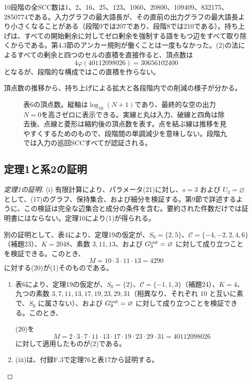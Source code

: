 \documentclass[11pt,reqno]{amsart}
\theoremstyle{definition}
\theoremstyle{definition}
\theoremstyle{remark}
\providecommand{\tightlist}{\setlength{\itemsep}{0pt}\setlength{\parskip}{0pt}}
\begin{document}
10段階の全SCC数は1、2、16、25、123、1060、20800、109409、832175、2850774である。入力グラフの最大語長が、その直前の出力グラフの最大語長より小さくなることがある（段階9では207であり、段階8では210である）。持ち上げは、すべての開始剰余に対してゼロ剰余を強制する語をもつ辺をすべて取り除くからである。第4.3節のアンカー規則が働くことは一度もなかった。(2)の法によるすべての剰余と四つのセルの直積を直接作ると、頂点数は
\[
4\varphi(40112098026)=30656102400
\]
となるが、段階的な構成ではこの直積を作らない。

頂点数の推移から、持ち上げによる拡大と各段階内での削減の様子が分かる。

\begin{figure}[htbp]
\centering

\caption{表6の頂点数。縦軸は\(\log_{10}(N+1)\)であり、最終的な空の出力\(N=0\)を高さゼロに表示できる。実線と丸は入力、破線と四角は除去後、点線と菱形は縮約後の頂点数を表す。点を結ぶ線は推移を見やすくするためのもので、段階間の単調減少を意味しない。段階九では入力の巡回SCCすべてが認証される。}
\label{fig:stage-counts}
\end{figure}

\subsection{定理1と系2の証明}\label{sec:5.4}

\begin{proof}[定理1の証明]\leavevmode\label{proof:1}
(i) 有限計算により、パラメータ(21)に対し、\(s=3\) および \(U_3=\varnothing\) として、(17)のグラフ、保持集合、および細分を検証する。第9節で詳述するように、この検証は完全な辺集合と成分の条件を含む。要約された件数だけでは証明書にはならない。定理10により(1)が得られる。

別の証明として、表4により、定理19の仮定が、\(S_0=\{2,5\}\)、\(\mathcal C=\{-4,-2,2,4,6\}\)（補題23）、\(K=2048\)、素数 \(3,11,13\)、および \(G_3^{\rm out}=\varnothing\) に対して成り立つことを検証できる。このとき、
\[
M=10\cdot3\cdot11\cdot13=4290
\]
に対する(20)が(1)そのものである。

\begin{enumerate}
\def\labelenumi{(\roman{enumi})}
\setcounter{enumi}{1}
\tightlist
\item
  表6により、定理19の仮定が、\(S_0=\{2\}\)、\(\mathcal C=\{-1,1,3\}\)（補題24）、\(K=4\)、九つの素数 \(3,7,11,13,17,19,23,29,31\)（相異なり、それぞれ \(10\) と互いに素で、\(S_0\) に属さない）、および \(G_9^{\rm out}=\varnothing\) に対して成り立つことを検証できる。このとき、

(20)を
\[
M=2\cdot3\cdot7\cdot11\cdot13\cdot17\cdot19\cdot23\cdot29\cdot31
=40112098026
\]
に対して適用したものが(2)である。
\item
  (iii)は、付録F.3で定理76と表17から証明する。\qedhere
\end{enumerate}
\end{proof}
\end{document}
